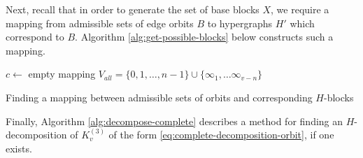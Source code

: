Next, recall that in order to generate the set of base blocks $X$, we require a mapping from admissible sets of edge orbits $B$ to hypergraphs $H'$ which correspond to $B$. Algorithm \ref{alg:get-possible-blocks} below constructs such a mapping.

\begin{algorithm}

$c \gets$ empty mapping\;
$V_{all} = \{0, 1, \ldots, n-1\} \cup \{\infty_{1}, \ldots \infty_{v-n}\}$\;
\;

\caption{Finding a mapping between admissible sets of orbits and corresponding $H$-blocks} \label{alg:get-possible-blocks}
\end{algorithm}

Finally, Algorithm \ref{alg:decompose-complete} describes a method for finding an $H$-decomposition of $K_{v}^{(3)}$ of the form \eqref{eq:complete-decomposition-orbit}, if one exists.

